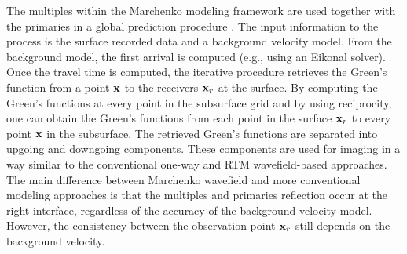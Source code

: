 The multiples within the Marchenko modeling framework are used 
together with the primaries in a global prediction procedure \citep{Behura,Wapenaar,Singh2015}.
The input information to the process is the surface recorded data and 
a background velocity model. From the background model, the first arrival is 
computed (e.g., using an Eikonal solver). Once the travel time is computed, the 
iterative procedure retrieves the Green's function from a point ${\bf x}$ to the receivers ${\bf x}_r$ at the surface. By 
computing the Green's functions at every point in the subsurface grid and  by using 
reciprocity, one can obtain the Green's functions from each point in the surface ${\bf x}_r$ to 
every point ${\bf x}$ in the subsurface. The retrieved Green's functions are separated 
into upgoing and downgoing components. These components are used for imaging 
in a way similar to the conventional one-way and RTM wavefield-based approaches. 
 The main difference between Marchenko wavefield and more conventional modeling approaches is that
the multiples and primaries reflection occur at the right interface, regardless of the 
accuracy of the background velocity model. However, the consistency between the observation 
point ${\bf x}_r$ still depends on the background velocity. 




